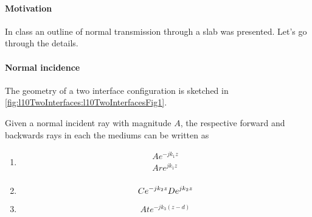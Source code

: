 
\renewcommand{\basename}{twoInterfaceNormal}
\renewcommand{\dirname}{notes/ece1228-electromagnetic-theory/}



\usepackage{peeters_layout_exercise}
\usepackage{peeters_braket}
\usepackage{peeters_figures}
\usepackage{siunitx}
\usepackage{enumerate}

\beginArtNoToc


\paragraph{Motivation}

In class an outline of normal transmission through a slab was presented.  Let's go through the details.

\paragraph{Normal incidence}

The geometry of a two interface configuration is sketched in \cref{fig:l10TwoInterfaces:l10TwoInterfacesFig1}.


Given a normal incident ray with magnitude \( A \), the respective forward and backwards rays in each the mediums can be written as

\begin{enumerate}[I]
\item
\begin{dmath}\label{eqn:twoInterfaceNormal:20}
\begin{aligned}
A e^{-j k_1 z} \\
A r e^{j k_1 z} \\
\end{aligned}
\end{dmath}
\item
\begin{dmath}\label{eqn:twoInterfaceNormal:40}
C e^{-j k_2 z} \\
D e^{j k_2 z} \\
\end{dmath}
\item
\begin{dmath}\label{eqn:twoInterfaceNormal:60}
A t e^{-j k_3 (z-d)}
\end{dmath}
\end{enumerate}

